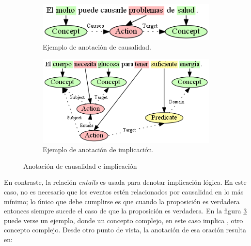 \begin{figure}[H]
	\centering
	\begin{subfigure}{3.25in}
		\includegraphics[width=\textwidth]{graphics/annotation_example_causes.png}
		\caption{Ejemplo de anotación de causalidad.}
		\vspace{0.4in}
		\label{fig:annotation_example_causes}
	\end{subfigure}
	\begin{subfigure}{3.9in}
		\includegraphics[width=\linewidth]{graphics/annotation_example_entails.png}
		\caption{Ejemplo de anotación de implicación.}
		\label{fig:annotation_example_entails}
	\end{subfigure}
	\caption{Anotación de causalidad e implicación}
\end{figure}

En contraste, la relación \textit{entails} es usada para denotar implicación lógica. En este caso, no es necesario que los eventos estén relacionados por causalidad en lo más mínimo; lo único que debe cumplirse es que cuando la proposición  es verdadera entonces siempre sucede el caso de que la proposición  es verdadera. En la figura \ref{fig:annotation_example_entails} puede verse un ejemplo, donde un concepto complejo, en este caso  implica , otro concepto complejo. Desde otro punto de vista, la anotación de esa oración resulta en:

\begin{center}
\end{center}

